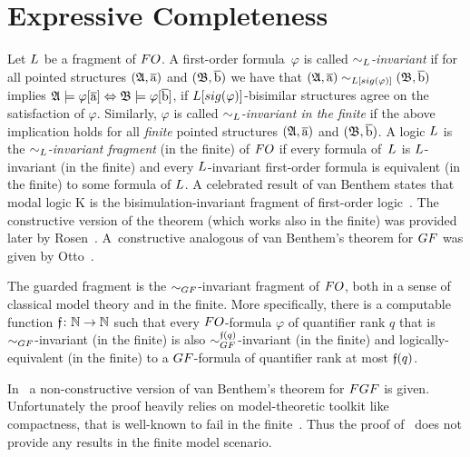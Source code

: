 
\section{Expressive Completeness}\label{sec:van-benthem-theorem}


Let $\logicL$ be a fragment of $\FO$. 
A first-order formula~$\varphi$ is called \emph{$\bisimto_{\logicL}$-invariant}
if for all pointed structures $({\mathfrak{A}},\overline{\mathrm{a}})$ and $({\mathfrak{B}}, \overline{\mathrm{b}})$ we have that  
$(\str{A},\elemtuplea) \bisimto_{\logicL[\sig(\varphi)]} (\str{B}, \elemtupleb)$ implies
${\mathfrak{A}} \models \varphi[\overline{\mathrm{a}}] \Leftrightarrow {\mathfrak{B}} \models \varphi[\overline{\mathrm{b}}]$, \ie if $\logicL[\sig(\varphi)]$-bisimilar structures agree on the satisfaction of $\varphi$.
Similarly, $\varphi$ is called \emph{$\bisimto_{\logicL}$-invariant in the finite} if the above implication holds for all \emph{finite} pointed structures $({\mathfrak{A}},\overline{\mathrm{a}})$ and $({\mathfrak{B}}, \overline{\mathrm{b}})$.
A logic $\logicL$ is the \emph{$\bisimto_{\logicL}$-invariant fragment} (in the finite) of $\FO$ if every formula of~$\logicL$ is $\logicL$-invariant (in the finite) and every $\logicL$-invariant first-order formula is equivalent (in the finite) to some formula of $\logicL$.
A celebrated result of van Benthem states that modal logic $\mathrm{K}$ is the bisimulation-invariant fragment of first-order logic~\cite[Thm.~2.2.1]{AndrekaNB98}. The constructive version of the theorem (which works also in the finite) was provided later by Rosen~\cite[Prop.~4]{Rosen97}.
A~constructive analogous of van Benthem's theorem for $\GF$ was given by Otto~\cite[Thm.~4.7]{Otto2012}.
\begin{theorem}\label{thm:vanBenthem-for-GF}
  The guarded fragment is the $\bisimto_{\GF}$-invariant fragment of $\FO$, both in a sense of classical model theory and in the finite.
  More specifically, there is a computable function $\mathfrak{f} \colon {\mathbb{N}} \to {\mathbb{N}}$ such that every $\FO$-formula $\varphi$ of quantifier rank $q$ that is $\bisimto_{\GF}$-invariant (in the finite) is also $\bisimto^{\homof(q)}_{\GF}$-invariant (in the finite) and logically-equivalent (in the finite) to a $\GF$-formula of quantifier rank at most $\mathfrak{f}(q)$.
\end{theorem}
In~\cite[Thm. 5]{BednarczykJ22} a non-constructive version of van Benthem's theorem for $\FGF$ is given. 
Unfortunately the proof heavily relies on model-theoretic toolkit like compactness, that is well-known to fail in the finite~\cite[Prop.~3.2]{Libkin04}. Thus the proof of~\cite[Thm.~5]{BednarczykJ22} does not provide any results in the finite model scenario.
